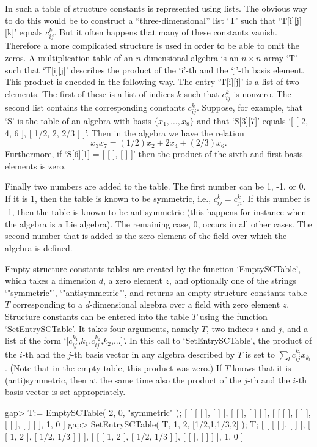In {\GAP} such a table of structure constants is represented using 
lists. The obvious way to do this
would be to construct a ``three-dimensional'' list `T' such that  
`T[i][j][k]' equals
$c_{ij}^k$. But it often happens that many of these constants vanish.
Therefore a more complicated structure is used in order to be able to 
omit
the zeros. A multiplication table of an $n$-dimensional algebra is an 
$n\times n$ array `T' such that `T[i][j]' describes the product
of the `i'-th and the `j'-th basis element. This product is encoded
in the following way. The entry `T[i][j]' is a list of two elements. 
The first of these is a list of
indices $k$ such that $c_{ij}^k$ is nonzero. The second list contains the
corresponding constants $c_{ij}^k$. Suppose, for example,  that `S' 
is the table 
of an algebra with basis $\{x_1,\ldots ,x_8\}$ and that `S[3][7]' 
equals `[ [ 2, 4, 6 ], [ 1/2, 2, 2/3 ] ]'. Then in the algebra we 
have the relation 
$$x_3 x_7=(1/2) x_2 + 2 x_4 + (2/3) x_6.$$
Furthermore, if `S[6][1] = [ [  ], [  ] ]' then the product of the
sixth and first basis elements is zero.

Finally two numbers are added to the table. The first number can be
1, -1, or 0. If it is 1, then the table is known to be symmetric,
i.e., $c_{ij}^k=c_{ji}^k$. If this number is -1, then the table is
known to be antisymmetric (this happens for instance when the algebra
is a Lie algebra).
The remaining case, 0, occurs in all other cases. 
The second number that is added is the zero element of the field over 
which the algebra is defined.  

Empty structure constants tables are created by the function
`EmptySCTable', which takes a dimension $d$, a zero element $z$,
and optionally one of the strings `"symmetric"', `"antisymmetric"',
and returns an empty structure constants table $T$ corresponding to
a $d$-dimensional algebra over a field with zero element $z$.
Structure constants can be entered into the table $T$ using the function
`SetEntrySCTable'.
It takes four arguments, namely $T$, two indices $i$ and $j$,
and a list of the form `[$c_{ij}^{k_1}$,$k_1$,$c_{ij}^{k_2}$,$k_2$,...]'.
In this call to `SetEntrySCTable',
the product of the $i$-th and the $j$-th basis vector
in any algebra described by $T$ is set to $\sum_l c_{ij}^{k_l} x_{k_l}$.
(Note that in the empty table, this product was zero.)
If $T$ knows that it is (anti)symmetric, then at the same time also
the product of the $j$-th and the $i$-th basis vector is set appropriately.

\beginexample
gap> T:= EmptySCTable( 2, 0, "symmetric" );
[ [ [ [  ], [  ] ], [ [  ], [  ] ] ], [ [ [  ], [  ] ], [ [  ], [  ] ] ], 1, 0 ]
gap> SetEntrySCTable( T, 1, 2, [1/2,1,1/3,2] );  T;
[ [ [ [  ], [  ] ], [ [ 1, 2 ], [ 1/2, 1/3 ] ] ], 
[ [ [ 1, 2 ], [ 1/2, 1/3 ] ], [ [  ], [  ] ] ], 1, 0 ]
\endexample

